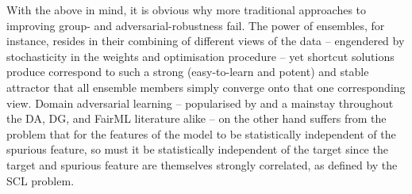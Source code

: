 With the above in mind, it is obvious why more traditional approaches to improving group- and
adversarial-robustness fail. 
%
The power of ensembles, for instance, resides in their combining of different views of the data --
engendered by stochasticity in the weights and optimisation procedure -- yet shortcut solutions
produce correspond to such a strong (easy-to-learn and potent) and stable attractor that all
ensemble members simply converge onto that one corresponding view.
%
Domain adversarial learning -- popularised by \cite{ganin2016domain} and a mainstay throughout the
DA, DG, and FairML literature alike -- on the other hand suffers from the problem that for the
features of the model to be statistically independent of the spurious feature, so must it be
statistically independent of the target since the target and spurious feature are themselves
strongly correlated, as defined by the SCL problem.


